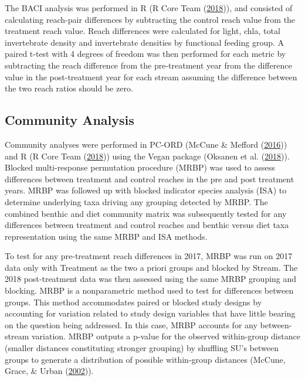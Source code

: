 \documentclass[double,12pt]{beavtex}
\begin{document}
  The BACI analysis was performed in R (R Core Team
  (\protect\hyperlink{ref-R-base}{2018})), and consisted of calculating
  reach-pair differences by subtracting the control reach value from the
  treatment reach value. Reach differences were calculated for light,
  chla, total invertebrate density and invertebrate densities by
  functional feeding group. A paired t-test with 4 degrees of freedom was
  then performed for each metric by subtracting the reach difference from
  the pre-treatment year from the difference value in the post-treatment
  year for each stream assuming the difference between the two reach
  ratios should be zero.
  
  \subsection*{Community Analysis}\label{community-analysis}
  
  Community analyses were performed in PC-ORD (McCune \& Mefford
  (\protect\hyperlink{ref-PC-ORD}{2016})) and R (R Core Team
  (\protect\hyperlink{ref-R-base}{2018})) using the Vegan package (Oksanen
  et al. (\protect\hyperlink{ref-vegan}{2018})). Blocked multi-response
  permutation procedure (MRBP) was used to assess differences between
  treatment and control reaches in the pre and post treatment years. MRBP
  was followed up with blocked indicator species analysis (ISA) to
  determine underlying taxa driving any grouping detected by MRBP. The
  combined benthic and diet community matrix was subsequently tested for
  any differences between treatment and control reaches and benthic versus
  diet taxa representation using the same MRBP and ISA methods.
  
  To test for any pre-treatment reach differences in 2017, MRBP was run on
  2017 data only with Treatment as the two a priori groups and blocked by
  Stream. The 2018 post-treatment data was then assessed using the same
  MRBP grouping and blocking. MRBP is a nonparametric method used to test
  for differences between groups. This method accommodates paired or
  blocked study designs by accounting for variation related to study
  design variables that have little bearing on the question being
  addressed. In this case, MRBP accounts for any between-stream variation.
  MRBP outputs a p-value for the observed within-group distance (smaller
  distances constituting stronger grouping) by shuffling SU's between
  groups to generate a distribution of possible within-group distances
  (McCune, Grace, \& Urban (\protect\hyperlink{ref-McCune2002}{2002})).
  
\end{document}
